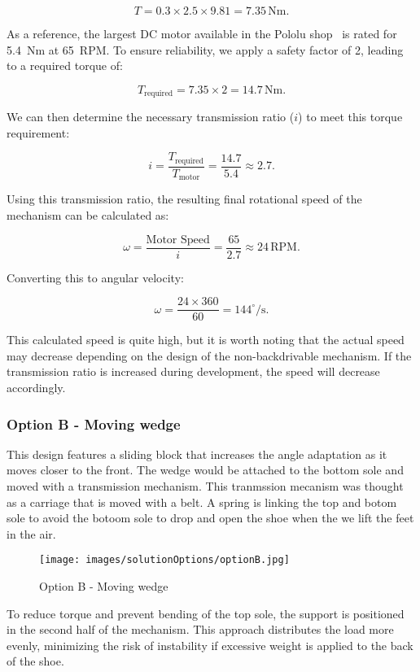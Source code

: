 \documentclass[lettersize,journal]{IEEEtran}
\begin{document}
\[
T = 0.3 \times 2.5 \times 9.81 = 7.35 \, \text{Nm}.
\]

As a reference, the largest DC motor available in the Pololu shop~\cite{pololu} is rated for 5.4~Nm at 65~RPM. To ensure reliability, we apply a safety factor of 2, leading to a required torque of:  

\[
T_{\text{required}} = 7.35 \times 2 = 14.7 \, \text{Nm}.
\]

We can then determine the necessary transmission ratio ($i$) to meet this torque requirement:  

\[
i = \frac{T_{\text{required}}}{T_{\text{motor}}} = \frac{14.7}{5.4} \approx 2.7.
\]

Using this transmission ratio, the resulting final rotational speed of the mechanism can be calculated as:  

\[
\omega = \frac{\text{Motor Speed}}{i} = \frac{65}{2.7} \approx 24 \, \text{RPM}.
\]

Converting this to angular velocity:  

\[
\omega = \frac{24 \times 360}{60} = 144^\circ/\text{s}.
\]

This calculated speed is quite high, but it is worth noting that the actual speed may decrease depending on the design of the non-backdrivable mechanism. If the transmission ratio is increased during development, the speed will decrease accordingly. 

\medskip \subsubsection{Option B - Moving wedge } \label{OptionB}
This design features a sliding block that increases the angle adaptation as it moves closer to the front. The wedge would be attached to the bottom sole and moved with a transmission mechanism. This tranmssion mecanism was thought as a carriage that is moved with a belt. A spring is linking the top and botom sole to avoid the botoom sole to drop and open the shoe when the we lift the feet in the air.
\begin{figure}[ht]
\centering
\texttt{[image: images/solutionOptions/optionB.jpg]}
\caption{Option B - Moving wedge}
\label{optionB}
\end{figure}

To reduce torque and prevent bending of the top sole, the support is positioned in the second half of the mechanism. This approach distributes the load more evenly, minimizing the risk of instability if excessive weight is applied to the back of the shoe.
\end{document}
